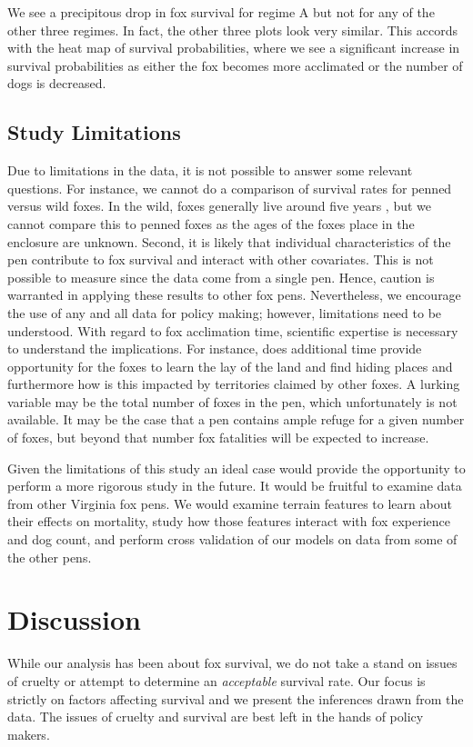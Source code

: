 \documentclass[aoas,preprint]{imsart}
\numberwithin{equation}{section}
\theoremstyle{plain}
\begin{document}
We see a precipitous drop in fox survival for regime A but not for any of the other three regimes. In fact, the other three plots look very similar. This accords with the heat map of survival probabilities, where we see a significant increase in survival probabilities as either the fox becomes more acclimated or the number of dogs is decreased. 

\subsection{Study Limitations}
Due to limitations in the data, it is not possible to answer some relevant questions. For instance, we cannot do a comparison of survival rates for penned versus wild foxes. In the wild, foxes generally live around five years \citep{hunter}, but we cannot compare this to penned foxes as the ages of the foxes place in the enclosure are unknown. Second, it is likely that individual characteristics of the pen contribute to fox survival and interact with other covariates. This is not possible to measure since the data come from a single pen. Hence, caution is warranted in applying these results to other fox pens. Nevertheless, we encourage the use of any and all data for policy making; however, limitations need to be understood. With regard to fox acclimation time, scientific expertise is necessary to understand the implications. For instance, does additional time provide opportunity for the foxes to learn the lay of the land and find hiding places and furthermore how is this impacted by territories claimed by other foxes. A lurking variable may be the total number of foxes in the pen, which unfortunately is not available. It may be the case that a pen contains ample refuge for a given number of foxes, but beyond that number fox fatalities will be expected to increase.

Given the limitations of this study an ideal case would provide the opportunity to perform a more rigorous study in the future. It would be fruitful to examine data from other Virginia fox pens. We would examine terrain features to learn about their effects on mortality, study how those features interact with fox experience and dog count, and perform cross validation of our models on data from some of the other pens.

\section{Discussion}
While our analysis has been about fox survival, we do not take a stand on issues of cruelty or attempt to determine an \emph{acceptable} survival rate. Our focus is strictly on factors affecting survival and we present the inferences drawn from the data. The issues of cruelty and survival are best left in the hands of policy makers.
\end{document}
